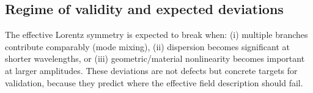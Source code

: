 \subsection{Regime of validity and expected deviations}

The effective Lorentz symmetry is expected to break when:
(i) multiple branches contribute comparably (mode mixing),
(ii) dispersion becomes significant at shorter wavelengths, or
(iii) geometric/material nonlinearity becomes important at larger amplitudes.
These deviations are not defects but concrete targets for validation, because they
predict where the effective field description should fail.
